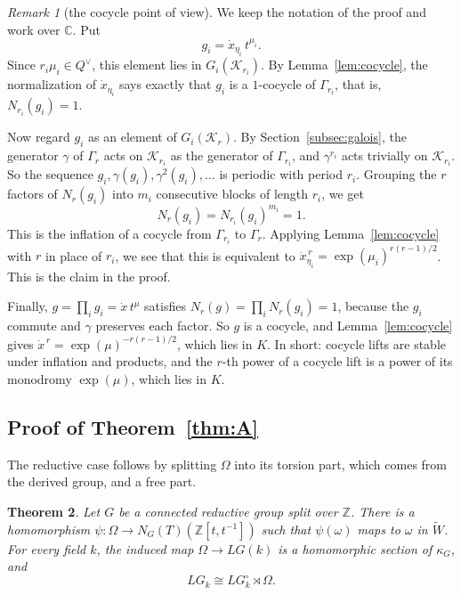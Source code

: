 \documentclass[psamsfonts]{amsart}
\newtheorem{thm}{Theorem}[section]
\theoremstyle{definition}
\theoremstyle{remark}
\newtheorem{rem}[thm]{Remark}
\numberwithin{equation}{section}
\newcommand{\Z}{\mathbb{Z}}   %
\newcommand{\extw}{\widetilde{W}}
\newcommand{\ra}{\rightarrow}
\newcommand\cK{\mathcal{K}}
\newcommand{\CC}{\mathbb{C}}
\numberwithin{equation}{section}
\newcommand{\om}{\omega}
\newcommand{\Om}{\Omega}
\theoremstyle{plain}
\begin{document}
\begin{rem}[the cocycle point of view]\label{rem:cocycle-gluing}
We keep the notation of the proof and work over $\CC$. Put
\[
g_i=\dot x_{\eta_i}\,t^{\mu_i}.
\]
Since $r_i\mu_i\in Q^\vee$, this element lies in $G_i(\cK_{r_i})$. By Lemma~\ref{lem:cocycle}, the normalization of $\dot x_{\eta_i}$ says exactly that $g_i$ is a $1$-cocycle of $\Gamma_{r_i}$, that is, $N_{r_i}(g_i)=1$.

Now regard $g_i$ as an element of $G_i(\cK_r)$. By Section~\ref{subsec:galois}, the generator $\gamma$ of $\Gamma_r$ acts on $\cK_{r_i}$ as the generator of $\Gamma_{r_i}$, and $\gamma^{r_i}$ acts trivially on $\cK_{r_i}$. So the sequence $g_i,\gamma(g_i),\gamma^2(g_i),\dots$ is periodic with period $r_i$. Grouping the $r$ factors of $N_r(g_i)$ into $m_i$ consecutive blocks of length $r_i$, we get
\[
N_r(g_i)=N_{r_i}(g_i)^{m_i}=1.
\]
This is the inflation of a cocycle from $\Gamma_{r_i}$ to $\Gamma_r$. Applying Lemma~\ref{lem:cocycle} with $r$ in place of $r_i$, we see that this is equivalent to $\dot x_{\eta_i}^{\,r}=\exp(\mu_i)^{r(r-1)/2}$. This is the claim in the proof.

Finally, $g=\prod_ig_i=\dot x\,t^{\mu}$ satisfies $N_r(g)=\prod_iN_r(g_i)=1$, because the $g_i$ commute and $\gamma$ preserves each factor. So $g$ is a cocycle, and Lemma~\ref{lem:cocycle} gives $\dot x^{\,r}=\exp(\mu)^{-r(r-1)/2}$, which lies in $K$. In short: cocycle lifts are stable under inflation and products, and the $r$-th power of a cocycle lift is a power of its monodromy $\exp(\mu)$, which lies in $K$.
\end{rem}

\subsection{Proof of Theorem~\ref{thm:A}}
The reductive case follows by splitting $\Om$ into its torsion part, which comes from the derived group, and a free part.

\begin{thm}\label{thm:A-body}
Let $G$ be a connected reductive group split over $\Z$. There is a homomorphism $\psi\colon\Om\ra N_G(T)(\Z[t,t^{-1}])$ such that $\psi(\om)$ maps to $\om$ in $\extw$. For every field $k$, the induced map $\Om\ra LG(k)$ is a homomorphic section of $\kappa_G$, and
\[
LG_k\cong LG_k^{\circ}\rtimes\Om.
\]
\end{thm}
\end{document}
